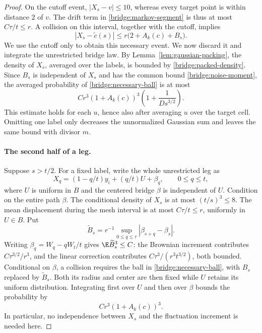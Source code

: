 \begin{proof}
On the cutoff event, $|X_s-v|\le10$, whereas every target point is within
distance $2$ of $v$.  The drift term in
\eqref{bridge:markov-segment} is thus at most $C\tau/t\le r$.
A collision on this interval, together with the cutoff, implies
\begin{equation}\label{bridge:necessary-ball}
 |X_s-\widetilde c(s)|
 \le r\bigl(2+A_k(c)+B_s\bigr).
\end{equation}
We use the cutoff only to obtain this necessary event.  We now discard
it and integrate the unrestricted bridge law.  By
Lemma~\ref{lem:gaussian-packing}, the density of $X_s$, averaged over
the labels, is bounded by \eqref{bridge:packed-density}.  Since $B_s$
is independent of $X_s$ and has the common bound
\eqref{bridge:noise-moment}, the averaged probability of
\eqref{bridge:necessary-ball} is at most
\begin{equation}\label{bridge:early-step}
 Cr^3(1+A_k(c))^3
 \left(1+\frac{1}{Ds^{3/2}}\right).
\end{equation}
This estimate holds for each $u$, hence also after averaging $u$ over
the target cell.  Omitting one label only decreases the unnormalized
Gaussian sum and leaves the same bound with divisor $m$.

\paragraph{The second half of a leg.}
Suppose $s>t/2$.  For a fixed label, write the whole unrestricted leg as
\[
 X_q=(1-q/t)y_i+(q/t)U+\beta_q,\qquad 0\le q\le t,
\]
where $U$ is uniform in $B$ and the centered bridge $\beta$ is
independent of $U$.  Condition on the entire path $\beta$.  The
conditional density of $X_s$ is at most $(t/s)^3\le8$.
The mean displacement during the mesh interval is at most
$C\tau/t\le r$, uniformly in $U\in B$.  Put
\[
 \widetilde B_s=
 r^{-1}\sup_{0\le q\le\tau}|\beta_{s+q}-\beta_s|.
\]
Writing $\beta_q=W_q-qW_t/t$ gives
$\E\widetilde B_s^3\le C$: the Brownian increment contributes
$C\tau^{3/2}/r^3$, and the linear correction contributes
$C\tau^3/(r^3t^{3/2})$, both bounded.  Conditional on $\beta$, a
collision requires the ball in \eqref{bridge:necessary-ball}, with
$B_s$ replaced by $\widetilde B_s$.  Both its radius and center are then
fixed while $U$ retains its uniform distribution.  Integrating first
over $U$ and then over $\beta$ bounds the probability by
\begin{equation}\label{bridge:late-step}
 Cr^3(1+A_k(c))^3.
\end{equation}
In particular, no independence between $X_s$ and the fluctuation
increment is needed here.


\end{proof}
